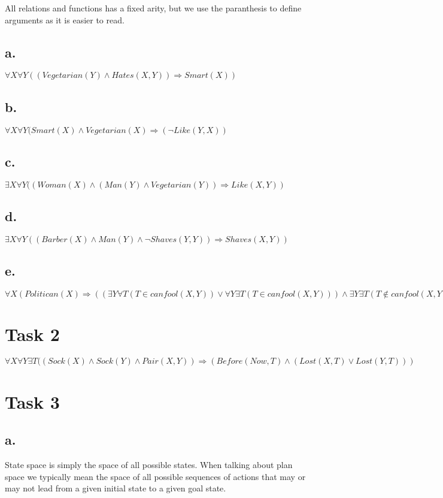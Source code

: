 \documentclass[a4paper, english, 11pt]{article}
\begin{document}
All relations and functions has a fixed arity, but we use the paranthesis to
define arguments as it is easier to read.

\subsection*{a.}

$\forall X \forall Y ((Vegetarian(Y) \wedge  Hates(X, Y)) \Rightarrow
Smart(X))$

\subsection*{b.}

$\forall X \forall Y (Smart(X) \wedge Vegetarian(X) \Rightarrow (\neg
Like(Y, X))$

\subsection*{c.}

$\exists X \forall Y ((Woman(X) \wedge (Man(Y) \wedge Vegetarian(Y))
\Rightarrow Like(X, Y))$

\subsection*{d.}

$\exists X \forall Y ((Barber(X) \wedge Man(Y) \wedge \neg Shaves(Y, Y))
\Rightarrow Shaves(X, Y))$

\subsection*{e.}

$\forall X(Politican(X) \Rightarrow ((\exists Y \forall T
(T \in canfool(X, Y)) \vee \forall Y \exists T (T \in canfool(X, Y))) \wedge
\exists Y \exists T (T \not\in canfool(X, Y))))$

\section*{Task 2}

$\forall X \forall Y \exists T ((Sock(X) \wedge Sock(Y) \wedge Pair(X, Y))
\Rightarrow (Before(Now, T) \wedge (Lost(X, T) \vee Lost(Y, T)))$

\section*{Task 3}
\subsection*{a.}
State space is simply the space of all possible states. When talking about plan
space we typically mean the space of all possible sequences of actions that
may or may not lead from a given initial state to a given goal state.
\end{document}
